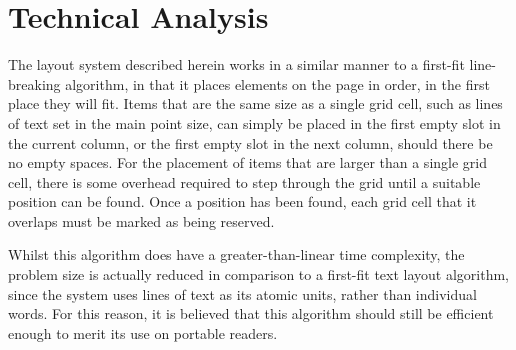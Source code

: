 \chapter{Technical Analysis}\label{ch:techanalysis}


The layout system described herein works in a similar manner to a first-fit line-breaking algorithm, in that it places elements on the page in order, in the first place they will fit. Items that are the same size as a single grid cell, such as lines of text set in the main point size, can simply be placed in the first empty slot in the current column, or the first empty slot in the next column, should there be no empty spaces.  For the placement of items that are larger than a single grid cell, there is some overhead required to step through the grid until a suitable position can be found. Once a position has been found, each grid cell that it overlaps must be marked as being reserved.

Whilst this algorithm does have a greater-than-linear time complexity, the problem size is actually reduced in comparison to a first-fit text layout algorithm, since the system uses lines of text as its atomic units, rather than individual words. For this reason, it is believed that this algorithm should still be efficient enough to merit its use on portable \ebook{} readers.

